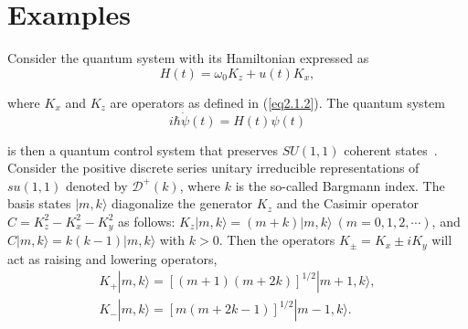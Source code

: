 \documentclass[onecolumn,showpacs,showkeys,preprintnumbers]{revtex4}
\begin{document}
\section{Examples}\label{sec5}

 Consider the quantum system with its
Hamiltonian expressed as~\cite{Gerry2}\noindent\begin{equation}\label{eq5.1}H(t)=\omega_0K_z+u(t)K_x,
\end{equation}

\noindent where $K_x$ and $K_z$ are operators as defined in
(\ref{eq2.1.2}). The quantum system\noindent\begin{equation}\label{eq5.2}i\hbar\dot{\psi}(t)=H(t)\psi(t)
\end{equation}

\noindent is then a quantum control system that preserves
$SU(1,1)$ coherent states~\cite{Gerry1}. Consider the positive
discrete series unitary irreducible representations of $su(1,1)$
denoted by $\mathscr{D}^{+}(k)$, where $k$ is the so-called
Bargmann index. The basis states $|m,k\rangle$ diagonalize the
generator $K_z$ and the Casimir operator $C=K_z^2-K_x^2-K_y^2$ as
follows: $K_z|m,k\rangle=(m+k)|m,k\rangle~(m=0,1,2,\cdots)$, and
$C|m,k\rangle=k(k-1)|m,k\rangle$ with $k>0$. Then the operators
$K_{\pm}=K_x{\pm}iK_y$ will act as raising and lowering operators,\noindent\begin{equation}\label{eq5.3}
\begin{array}{l}
   K_+|m,k\rangle=[(m+1)(m+2k)]^{1/2}|m+1,k\rangle,\\
   K_-|m,k\rangle=[m(m+2k-1)]^{1/2}|m-1,k\rangle.\\
\end{array}
\end{equation}
\end{document}
